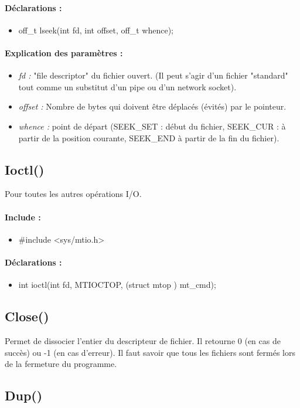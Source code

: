 \documentclass{article}[12pt]
\begin{document}
\paragraph{Déclarations : }
\begin{itemize}
	\item off\_t lseek(int fd, int offset, off\_t whence);
\end{itemize}
\paragraph{Explication des paramètres : }
\begin{itemize}
	\item \emph{fd : } "file descriptor" du fichier ouvert. (Il peut s'agir d'un fichier "standard" tout comme un substitut d'un pipe ou d'un network socket).
	\item \emph{offset : } Nombre de bytes qui doivent être déplacés (évités) par le pointeur.
	\item \emph{whence : } point de départ (SEEK\_SET : début du fichier, SEEK\_CUR : à partir de la position courante, SEEK\_END à partir de la fin du fichier).
\end{itemize}
\subsection{Ioctl()}
Pour toutes les autres opérations I/O.
\paragraph{Include : }
\begin{itemize}
	\item \#include <sys/mtio.h>
\end{itemize}
\paragraph{Déclarations : }
\begin{itemize}
	\item int ioctl(int fd, MTIOCTOP, (struct mtop \*) mt\_cmd);
\end{itemize}
\subsection{Close()}
Permet de dissocier l'entier du descripteur de fichier. Il retourne 0 (en cas de succès) ou -1 (en cas d'erreur). Il faut savoir que tous les fichiers sont fermés lors de la fermeture du programme.
\subsection{Dup()}
\end{document}
